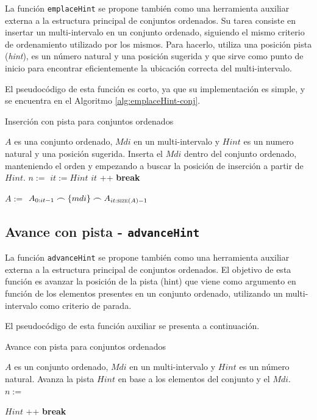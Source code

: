 La función \texttt{emplaceHint} se propone también como una herramienta auxiliar externa a la estructura principal de conjuntos ordenados. Su tarea consiste en insertar un multi-intervalo en un conjunto ordenado, siguiendo el mismo criterio de ordenamiento utilizado por los mismos. Para hacerlo, utiliza una posición pista (\textit{hint}), es un número natural y una posición sugerida y que sirve como punto de inicio para encontrar eficientemente la ubicación correcta del multi-intervalo.

El pseudocódigo de esta función es corto, ya que su implementación es simple, y se encuentra en el Algoritmo \ref{alg:emplaceHint-conj}.

\begin{algorithm}
\caption{Inserción con pista para conjuntos ordenados}
\label{alg:emplaceHint-conj}
\begin{algorithmic}[1]
\Require $A$ es una conjunto ordenado, $Mdi$ en un multi-intervalo y $Hint$ es un numero natural y una posición sugerida.
\Ensure Inserta el $Mdi$ dentro del conjunto ordenado, manteniendo el orden y empezando a buscar la posición de inserción a partir de $Hint$.
     \State $n :=$ 
    \State $it := Hint$ 
            \State $it$ \!+\!+
        \Else
            \State \textbf{break}
        \EndIf
    \EndWhile

      \State $A :=$ $A_{0:it-1} \frown \{mdi\} \frown A_{it:\Call{size}{A}-1}$
\EndFunction
\end{algorithmic}
\end{algorithm}


\subsection{Avance con pista - \texttt{advanceHint}}

La función \texttt{advanceHint} se propone también como una herramienta auxiliar externa a la estructura principal de conjuntos ordenados. El objetivo de esta función es avanzar la posición de la pista (hint) que viene como argumento en función de los elementos presentes en un conjunto ordenado, utilizando un multi-intervalo como criterio de parada.

El pseudocódigo de esta función auxiliar se presenta a continuación.


\begin{algorithm}
\caption{Avance con pista para conjuntos ordenados}
\label{alg:advanceHint}
\begin{algorithmic}[1]
\Require $A$ es un conjunto ordenado, $Mdi$ en un multi-intervalo y $Hint$ es un número natural.
\Ensure Avanza la pista $Hint$ en base a los elementos del conjunto y el $Mdi$.
    \State $n :=$ 
    
            \State $Hint$ \!+\!+
        \Else
            \State \textbf{break}
        \EndIf
    \EndWhile
\EndFunction
\end{algorithmic}
\end{algorithm}



